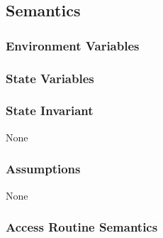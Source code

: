 \documentclass[12pt, titlepage]{article}
\begin{document}
\subsection* {Semantics}

\subsubsection* {Environment Variables}

\subsubsection* {State Variables}

\subsubsection* {State Invariant}

None

\subsubsection* {Assumptions}

None

\subsubsection* {Access Routine Semantics}

\newpage
\end{document}
